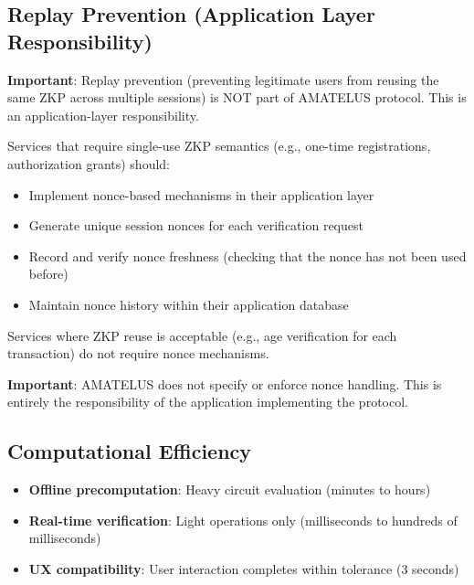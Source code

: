 \subsection{Replay Prevention (Application Layer Responsibility)}

\textbf{Important}: Replay prevention (preventing legitimate users from reusing the same ZKP across multiple sessions)
is NOT part of AMATELUS protocol. This is an application-layer responsibility.

Services that require single-use ZKP semantics (e.g., one-time registrations, authorization grants) should:

\begin{itemize}
  \item Implement nonce-based mechanisms in their application layer
  \item Generate unique session nonces for each verification request
  \item Record and verify nonce freshness (checking that the nonce has not been used before)
  \item Maintain nonce history within their application database
\end{itemize}

Services where ZKP reuse is acceptable (e.g., age verification for each transaction) do not require
nonce mechanisms.

\textbf{Important}: AMATELUS does not specify or enforce nonce handling. This is entirely
the responsibility of the application implementing the protocol.

\subsection{Computational Efficiency}

\begin{itemize}
  \item \textbf{Offline precomputation}: Heavy circuit evaluation (minutes to hours)
  \item \textbf{Real-time verification}: Light operations only (milliseconds to hundreds of milliseconds)
  \item \textbf{UX compatibility}: User interaction completes within tolerance (3 seconds)
\end{itemize}

